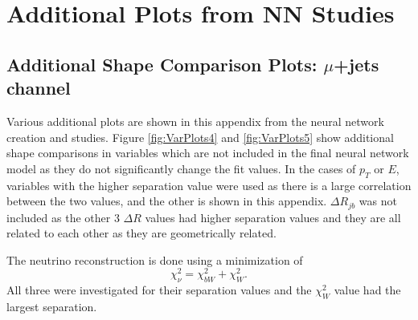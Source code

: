 \chapter{Additional Plots from NN Studies}

\section{Additional Shape Comparison Plots: $\mu$+jets channel}
Various additional plots are shown in this appendix from the neural network creation and studies.  Figure \ref{fig:VarPlots4} and \ref{fig:VarPlots5} show additional shape comparisons in variables which are not included in the final neural network model as they do not significantly change the fit values.  In the cases of $p_T$ or $E$, variables with the higher separation value were used as there is a large correlation between the two values, and the other is shown in this appendix.  $\Delta R_{jb}$ was not included as the other 3 $\Delta R$ values had higher separation values and they are all related to each other as they are geometrically related. 

The neutrino reconstruction is done using a minimization of \[ \chi^2_{\nu} = \chi^2_{bW} + \chi^2_{W}. \]  All three were investigated for their separation values and the $\chi^2_{W}$ value had the largest separation.


